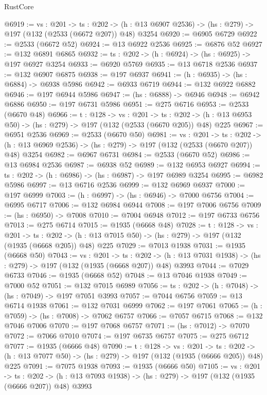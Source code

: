 \begin{lexlean}{RustCore}
\begin{coremodule}
@6919 := {vs : @201} ->
  {ts : @202} -> (h : @13 @6907 @2536) -> (hs : @279) -> @197 (@132 (@2533 (@6672 @207)) @48) @3254
@6920 := @6905 @6729
@6922 := @2533 (@6672 @52)
@6924 := @13 @6922 @2536
@6925 := @6876 @52
@6927 := @132 @6891 @6865
@6932 := {ts : @202} -> (h : @6924) -> (hs : @6925) -> @197 @6927 @3254
@6933 := @6920 @5769
@6935 := @13 @6718 @2536
@6937 := @132 @6907 @6875
@6938 := @197 @6937
@6941 := (h : @6935) -> (hs : @6884) -> @6938 @5986
@6942 := @6933 @6719
@6944 := @132 @6922 @6882
@6946 := @197 @6944 @5986
@6947 := (hs : @6888) -> @6946
@6948 := @6942 @6886
@6950 := @197 @6731 @5986
@6951 := @275 @6716
@6953 := @2533 (@6670 @48)
@6966 := {t : @128} ->
  {vs : @201} ->
  {ts : @202} -> (h : @13 @6953 @50) -> (hs : @279) -> @197 (@132 (@2533 (@6670 @205)) @48) @225
@6967 := @6951 @2536
@6969 := @2533 (@6670 @50)
@6981 := {vs : @201} ->
  {ts : @202} -> (h : @13 @6969 @2536) -> (hs : @279) -> @197 (@132 (@2533 (@6670 @207)) @48) @3254
@6982 := @6967 @6731
@6984 := @2533 (@6670 @52)
@6986 := @13 @6984 @2536
@6987 := @6938 @52
@6989 := @132 @6953 @6927
@6994 := {ts : @202} -> (h : @6986) -> (hs : @6987) -> @197 @6989 @3254
@6995 := @6982 @5986
@6997 := @13 @6716 @2536
@6999 := @132 @6969 @6937
@7000 := @197 @6999
@7003 := (h : @6997) -> (hs : @6946) -> @7000 @6756
@7004 := @6995 @6717
@7006 := @132 @6984 @6944
@7008 := @197 @7006 @6756
@7009 := (hs : @6950) -> @7008
@7010 := @7004 @6948
@7012 := @197 @6733 @6756
@7013 := @275 @6714
@7015 := @1935 (@6668 @48)
@7028 := {t : @128} ->
  {vs : @201} ->
  {ts : @202} -> (h : @13 @7015 @50) -> (hs : @279) -> @197 (@132 (@1935 (@6668 @205)) @48) @225
@7029 := @7013 @1938
@7031 := @1935 (@6668 @50)
@7043 := {vs : @201} ->
  {ts : @202} -> (h : @13 @7031 @1938) -> (hs : @279) -> @197 (@132 (@1935 (@6668 @207)) @48) @3993
@7044 := @7029 @6733
@7046 := @1935 (@6668 @52)
@7048 := @13 @7046 @1938
@7049 := @7000 @52
@7051 := @132 @7015 @6989
@7056 := {ts : @202} -> (h : @7048) -> (hs : @7049) -> @197 @7051 @3993
@7057 := @7044 @6756
@7059 := @13 @6714 @1938
@7061 := @132 @7031 @6999
@7062 := @197 @7061
@7065 := (h : @7059) -> (hs : @7008) -> @7062 @6757
@7066 := @7057 @6715
@7068 := @132 @7046 @7006
@7070 := @197 @7068 @6757
@7071 := (hs : @7012) -> @7070
@7072 := @7066 @7010
@7074 := @197 @6735 @6757
@7075 := @275 @6712
@7077 := @1935 (@6666 @48)
@7090 := {t : @128} ->
  {vs : @201} ->
  {ts : @202} -> (h : @13 @7077 @50) -> (hs : @279) -> @197 (@132 (@1935 (@6666 @205)) @48) @225
@7091 := @7075 @1938
@7093 := @1935 (@6666 @50)
@7105 := {vs : @201} ->
  {ts : @202} -> (h : @13 @7093 @1938) -> (hs : @279) -> @197 (@132 (@1935 (@6666 @207)) @48) @3993

\end{coremodule}
\end{lexlean}
